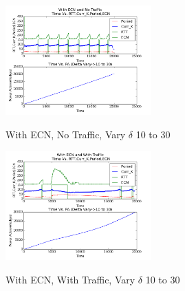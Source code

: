 \begin{figure}[htb]
  \begin{center}

    \includegraphics[width=0.50\textwidth]{Figures/iccps2014/w_ecn_no_tr_d10_30.png}
  \caption{With ECN, No Traffic, Vary $\delta$ 10 to 30}
  \label{fig:w_ecn_no_tr_d10_30}
    \includegraphics[width=0.50\textwidth]{Figures/iccps2014/w_ecn_w_tr_d10_30.png}
  \caption{With ECN, With Traffic, Vary $\delta$ 10 to 30}
  \label{fig:w_ecn_w_tr_d10_30}

  \end{center}
\end{figure}











